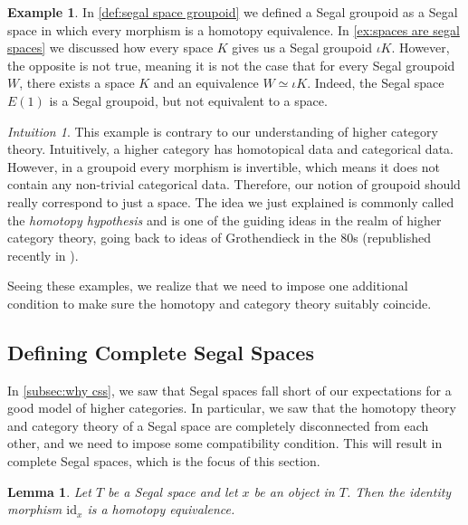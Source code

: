 \documentclass[11pt, a4paper]{amsart}
\newcommand{\id}{\mathrm{id}}
\newtheorem{lemma}[equation]{Lemma}
\theoremstyle{definition}
\newtheorem{example}[equation]{Example}
\theoremstyle{remark}
\newtheorem{intuition}[equation]{Intuition}
\numberwithin{equation}{section}
\begin{document}
 \begin{example} \label{ex:segal space groupoid homotopy hypothesis}
  In \cref{def:segal space groupoid} we defined a Segal groupoid as a Segal space in which every morphism is a homotopy equivalence. In \cref{ex:spaces are segal spaces} we discussed how every space $K$ gives us a Segal groupoid $\iota K$. However, the opposite is not true, meaning it is not the case that for every Segal groupoid $W$, there exists a space $K$ and an equivalence $W\simeq\iota K$. Indeed, the Segal space $E(1)$ is a Segal groupoid, but not equivalent to a space.
 \end{example}
 
\begin{intuition} \label{int:homotopy hypothesis}
 This example is contrary to our understanding of higher category theory. Intuitively, a higher category has homotopical data and categorical data. However, in a groupoid every morphism is invertible, which means it does not contain any non-trivial categorical data. Therefore, our notion of groupoid should really correspond to just a space. The idea we just explained is commonly called the \emph{homotopy hypothesis} and is one of the guiding ideas in the realm of higher category theory, going back to ideas of Grothendieck in the 80s (republished recently in \cite{grothendieck2022pursuingstacks}). 
\end{intuition}

Seeing these examples, we realize that we need to impose one additional condition to make sure the homotopy and category theory suitably coincide.

 \subsection{Defining Complete Segal Spaces} \label{subsec:css}
 In \cref{subsec:why css}, we saw that Segal spaces fall short of our expectations for a good model of higher categories. In particular, we saw that the homotopy theory and category theory of a Segal space are completely disconnected from each other, and we need to impose some compatibility condition. This will result in complete Segal spaces, which is the focus of this section.

\begin{lemma} \label{lemma:identity is hoequiv}
 Let $T$ be a Segal space and let $x$ be an object in $T$. Then the identity morphism $\id_x$ is a homotopy equivalence.
\end{lemma}
\end{document}

